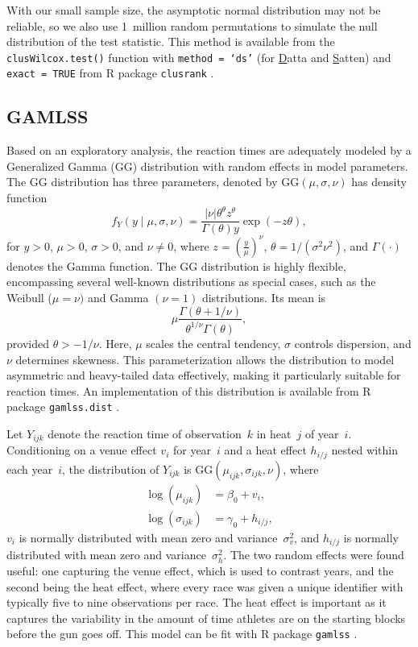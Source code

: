 \documentclass[12pt, letterpaper]{article}
\begin{document}
With our small sample size, the asymptotic normal distribution may not be
reliable, so we also use 1~million random permutations to simulate the null 
distribution of the test statistic.
This method is available from the \texttt{clusWilcox.test()} function
with \texttt{method = `ds'} (for \underline{D}atta and \underline{S}atten) and 
\texttt{exact = TRUE} from R package
\texttt{clusrank} \citep{jiang2020wilcoxon}. 


\subsection{GAMLSS}\label{sec:gamlss}

Based on an exploratory analysis, the reaction times are adequately
modeled by a Generalized Gamma (GG) distribution with random effects in
model parameters. The GG distribution has three parameters, denoted by
$\text{GG}(\mu, \sigma, \nu)$ has density function
\[
f_Y(y \mid \mu, \sigma, \nu) = 
\frac{|\nu| \theta^\theta z^{\theta}}{\Gamma(\theta) y} 
\exp\left(-z \theta\right),
\]
for $y > 0$, $\mu > 0$, $\sigma > 0$, and $\nu \neq 0$,
where $z = \left(\frac{y}{\mu}\right)^\nu$,
$\theta = 1 / (\sigma^2 \nu^2)$, and
$\Gamma(\cdot)$ denotes the Gamma function.
The GG distribution is highly flexible, encompassing several  
well-known distributions as special cases, such as the
Weibull ($\mu = \nu)$ and  Gamma $(\nu = 1)$ distributions.
Its mean is
\[
  \mu \frac{\Gamma(\theta + 1 / \nu)}
  {\theta^{1 / \nu} \Gamma(\theta)},
\]
provided $\theta > -1 / \nu$. Here,
$\mu$ scales the central tendency, $\sigma$ controls 
dispersion, and $\nu$ determines skewness. This parameterization allows 
the distribution to model asymmetric and heavy-tailed data effectively, making 
it particularly suitable for reaction times.
An implementation of this distribution is available from R package
\texttt{gamlss.dist} \citep{rigby2019distributions}.



Let $Y_{ijk}$ denote the reaction time of observation~$k$ in heat~$j$
of year~$i$. Conditioning on a venue effect $v_i$ for year~$i$ 
and a heat effect $h_{i/j}$ nested within each year~$i$, the
distribution of $Y_{ijk}$ is
$\text{GG}(\mu_{ijk}, \sigma_{ijk}, \nu)$, where
\begin{align}
\log(\mu_{ijk}) &= \beta_0 + v_i ,\\
\log(\sigma_{ijk}) &= \gamma_0 + h_{i/j},
\end{align}
$v_i$ is normally distributed with mean zero and
variance~$\sigma_v^2$, and $h_{i/j}$ is normally distributed with mean
zero and variance~$\sigma_h^2$.
The two random effects were found useful: one capturing the venue effect, which
is used to contrast years, and the second being the heat effect, where every
race was given a unique identifier with typically five to nine observations
per race. The heat effect is important as it captures the variability in the
amount of time athletes are on the starting blocks before the gun goes off.
This model can be fit with R package \texttt{gamlss}
\citep{stasinopoulos2024generalized}.
\end{document}

